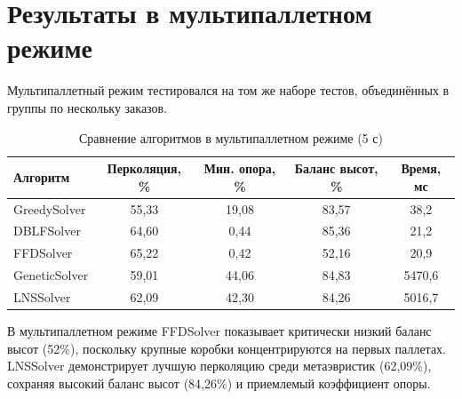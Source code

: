\section{Результаты в мультипаллетном режиме}

Мультипаллетный режим тестировался на том же наборе тестов, объединённых в группы по нескольку заказов.

\begin{table}[H]
    \caption{Сравнение алгоритмов в мультипаллетном режиме (5 с)}
    \centering
    \begin{tabular}{|l|c|c|c|c|}
    \hline
    \textbf{Алгоритм} & \textbf{Перколяция, \%} & \textbf{Мин. опора, \%} & \textbf{Баланс высот, \%} & \textbf{Время, мс} \\
    \hline
    GreedySolver   & 55,33 & 19,08 & 83,57 &   38,2 \\
    DBLFSolver     & 64,60 &  0,44 & 85,36 &   21,2 \\
    FFDSolver      & 65,22 &  0,42 & 52,16 &   20,9 \\
    GeneticSolver  & 59,01 & 44,06 & 84,83 & 5470,6 \\
    LNSSolver      & 62,09 & 42,30 & 84,26 & 5016,7 \\
    \hline
    \end{tabular}
    \label{tab:metrics_multi}
\end{table}

В мультипаллетном режиме FFDSolver показывает критически низкий баланс высот (52\%), поскольку крупные коробки концентрируются на первых паллетах. LNSSolver демонстрирует лучшую перколяцию среди метаэвристик (62,09\%), сохраняя высокий баланс высот (84,26\%) и приемлемый коэффициент опоры.